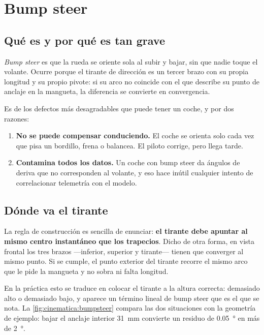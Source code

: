 \section{Bump steer}
\label{sec:cinematica_suspension:03}

\subsection{Qué es y por qué es tan grave}

\emph{Bump steer} es que la rueda se oriente sola al subir y bajar, sin que
nadie toque el volante. Ocurre porque el tirante de dirección es un tercer
brazo con su propia longitud y su propio pivote: si su arco no coincide con el
que describe su punto de anclaje en la mangueta, la diferencia se convierte en
convergencia.

Es de los defectos más desagradables que puede tener un coche, y por dos
razones:

\begin{enumerate}
  \item \textbf{No se puede compensar conduciendo.} El coche se orienta solo
        cada vez que pisa un bordillo, frena o balancea. El piloto corrige,
        pero llega tarde.
  \item \textbf{Contamina todos los datos.} Un coche con bump steer da ángulos
        de deriva que no corresponden al volante, y eso hace inútil cualquier
        intento de correlacionar telemetría con el modelo.
\end{enumerate}

\subsection{Dónde va el tirante}

La regla de construcción es sencilla de enunciar: \textbf{el tirante debe
apuntar al mismo centro instantáneo que los trapecios}. Dicho de otra forma, en
vista frontal los tres brazos ---inferior, superior y tirante--- tienen que
converger al mismo punto. Si se cumple, el punto exterior del tirante recorre
el mismo arco que le pide la mangueta y no sobra ni falta longitud.

En la práctica esto se traduce en colocar el tirante a la altura correcta:
demasiado alto o demasiado bajo, y aparece un término lineal de bump steer que
es el que se nota. La \cref{fig:cinematica:bumpsteer} compara las dos
situaciones con la geometría de ejemplo: bajar el anclaje interior
\SI{31}{\milli\meter} convierte un residuo de \SI{0.05}{\degree} en más de
\SI{2}{\degree}.

